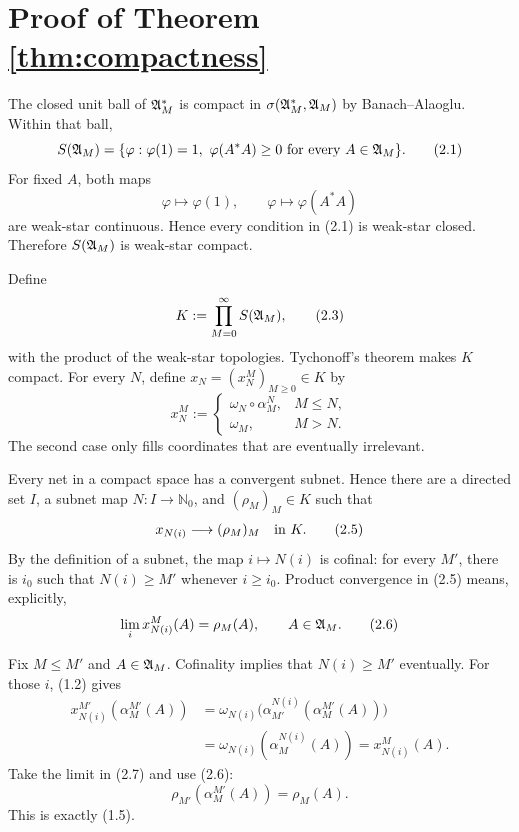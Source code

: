 \documentclass[11pt,a4paper]{article}
\begin{document}
\section{Proof of Theorem \ref{thm:compactness}}


The closed unit ball of \(\mathfrak A_M^*\) is compact in
\(\sigma(\mathfrak A_M^*,\mathfrak A_M)\) by Banach--Alaoglu.  Within that ball,
\[
 S(\mathfrak A_M)=
 \{\varphi:\varphi(1)=1,\ \varphi(A^*A)\ge0\text{ for every }A\in\mathfrak A_M\}. \tag{2.1}
\]
For fixed \(A\), both maps
\[
 \varphi\longmapsto\varphi(1),\qquad
 \varphi\longmapsto\varphi(A^*A)                               \tag{2.2}
\]
are weak-star continuous.  Hence every condition in (2.1) is weak-star closed.
Therefore \(S(\mathfrak A_M)\) is weak-star compact.


Define
\[
 K:=\prod_{M=0}^{\infty}S(\mathfrak A_M),                               \tag{2.3}
\]
with the product of the weak-star topologies.  Tychonoff's theorem makes \(K\)
compact.  For every \(N\), define \(x_N=(x_N^M)_{M\ge0}\in K\) by
\[
 x_N^M:=
 \begin{cases}
  \omega_N\circ\alpha_M^N,&M\le N,\\
  \omega_M,&M>N.
 \end{cases}                                                    \tag{2.4}
\]
The second case only fills coordinates that are eventually irrelevant.


Every net in a compact space has a convergent subnet.  Hence there are a directed set
\(I\), a subnet map \(N:I\to\mathbb N_0\), and
\((\rho_M)_M\in K\) such that
\[
 x_{N(i)}\longrightarrow(\rho_M)_M\quad\hbox{in }K.             \tag{2.5}
\]
By the definition of a subnet, the map \(i\mapsto N(i)\) is cofinal: for every
\(M'\), there is \(i_0\) such that \(N(i)\ge M'\) whenever \(i\ge i_0\).
Product convergence in (2.5) means, explicitly,
\[
 \lim_i x_{N(i)}^M(A)=\rho_M(A),\qquad A\in\mathfrak A_M.                \tag{2.6}
\]


Fix \(M\le M'\) and \(A\in\mathfrak A_M\).  Cofinality implies that \(N(i)\ge M'\)
eventually.  For those \(i\), (1.2) gives
\begin{align}
 x_{N(i)}^{M'}(\alpha_M^{M'}(A))
 &=\omega_{N(i)}\bigl(\alpha_{M'}^{N(i)}
      (\alpha_M^{M'}(A))\bigr)\\
 &=\omega_{N(i)}(\alpha_M^{N(i)}(A))
 =x_{N(i)}^M(A).                                                \tag{2.7}
\end{align}
Take the limit in (2.7) and use (2.6):
\[
 \rho_{M'}(\alpha_M^{M'}(A))=\rho_M(A).                         \tag{2.8}
\]
This is exactly (1.5).
\end{document}
